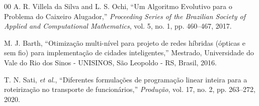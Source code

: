 \documentclass[conference,12pt]{IEEEtran}
\begin{document}
\begin{thebibliography}{00}
     A. R. Villela da Silva and L. S. Ochi,
    ``Um Algoritmo Evolutivo para o Problema do Caixeiro Alugador,''
    \textit{Proceeding Series of the Brazilian Society of Applied
        and Computational Mathematics}, vol. 5, no. 1, pp. 460--467, 2017.


     M. J. Barth, ``Otimização multi-nível para
    projeto de redes híbridas (ópticas e sem fio) para implementação
    de cidades inteligentes,'' Mestrado, Universidade do
    Vale do Rio dos Sinos - UNISINOS, São Leopoldo - RS, Brasil, 2016.

     T. N. Sati, \textit{et al.}, ``Diferentes formulações de programação linear
    inteira para a roteirização no transporte de funcionários,''
    \textit{Produção}, vol. 17, no. 2, pp. 263--272, 2020.








\end{thebibliography}
\end{document}
